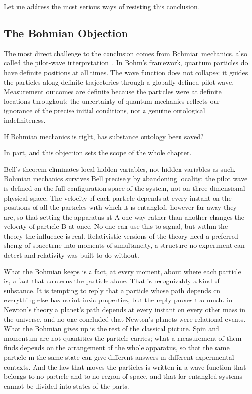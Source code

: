 Let me address the most serious ways of resisting this conclusion.

\subsection*{The Bohmian Objection}

The most direct challenge to the conclusion comes from Bohmian mechanics, also
called the pilot-wave interpretation~\citep{Bohm1980}.
In Bohm's framework, quantum particles do have definite positions at all times.
The wave function does not collapse; it guides the particles along definite
trajectories through a globally defined pilot wave.
Measurement outcomes are definite because the particles were at definite
locations throughout; the uncertainty of quantum mechanics reflects our ignorance
of the precise initial conditions, not a genuine ontological indefiniteness.

If Bohmian mechanics is right, has substance ontology been saved?

In part, and this objection sets the scope of the whole chapter.

Bell's theorem eliminates local hidden variables, not hidden variables as such.
Bohmian mechanics survives Bell precisely by abandoning locality: the pilot wave
is defined on the full configuration space of the system, not on three-dimensional
physical space.
The velocity of each particle depends at every instant on the positions of all the
particles with which it is entangled, however far away they are, so that setting
the apparatus at A one way rather than another changes the velocity of particle B
at once.
No one can use this to signal, but within the theory the influence is real.
Relativistic versions of the theory need a preferred slicing of spacetime into
moments of simultaneity, a structure no experiment can detect and relativity was
built to do without.

What the Bohmian keeps is a fact, at every moment, about where each particle is,
a fact that concerns the particle alone.
That is recognizably a kind of substance.
It is tempting to reply that a particle whose path depends on everything else has
no intrinsic properties, but the reply proves too much: in Newton's theory a
planet's path depends at every instant on every other mass in the universe, and
no one concluded that Newton's planets were relational events.
What the Bohmian gives up is the rest of the classical picture.
Spin and momentum are not quantities the particle carries; what a measurement of
them finds depends on the arrangement of the whole apparatus, so that the same
particle in the same state can give different answers in different experimental
contexts.
And the law that moves the particles is written in a wave function that belongs
to no particle and to no region of space, and that for entangled systems cannot
be divided into states of the parts.

